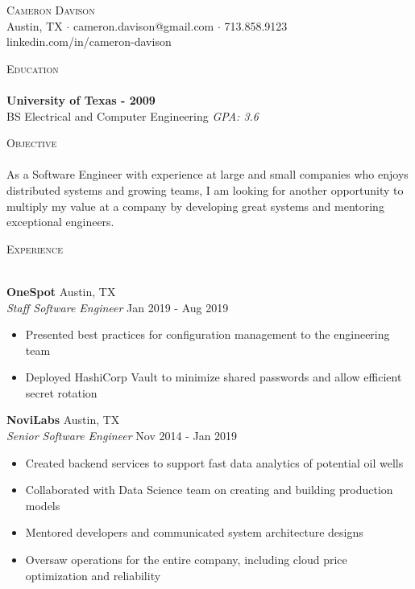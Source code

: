 \documentclass[a4paper]{article}
\newcommand{\lineunder} {
    \vspace*{-8pt} \\
    \hspace*{-18pt} \hrulefill \\
}
\newcommand{\header} [1] {
    {\hspace*{-18pt}\vspace*{6pt} \textsc{#1}}
    \vspace*{-6pt} \lineunder
}
\begin{document}
\vspace*{-40pt}

\vspace*{-10pt}
\begin{center}
    {\Huge \scshape {Cameron Davison}}\\
    Austin, TX $\cdot$ cameron.davison@gmail.com $\cdot$ 713.858.9123\\
    linkedin.com/in/cameron-davison\\
\end{center}

\header{Education}
\textbf{University of Texas - 2009}\\
BS Electrical and Computer Engineering \textit{GPA: 3.6}\\
\vspace{2mm}

\header{Objective}
As a Software Engineer with experience at large and small companies who enjoys distributed systems and growing teams, I
am looking for another opportunity to multiply my value at a company by developing great systems and mentoring
exceptional engineers.
\vspace{2mm}

\header{Experience}
\vspace{1mm}

\textbf{OneSpot} \hfill Austin, TX\\
\textit{Staff Software Engineer} \hfill Jan 2019 - Aug 2019\\
\vspace{-1mm}
\begin{itemize} \itemsep 1pt
\item Presented best practices for configuration management to the engineering team
\item Deployed HashiCorp Vault to minimize shared passwords and allow efficient secret rotation
\end{itemize}

\textbf{NoviLabs} \hfill Austin, TX\\
\textit{Senior Software Engineer} \hfill Nov 2014 - Jan 2019\\
\vspace{-1mm}
\begin{itemize} \itemsep 1pt
\item Created backend services to support fast data analytics of potential oil wells
\item Collaborated with Data Science team on creating and building production models
\item Mentored developers and communicated system architecture designs
\item Oversaw operations for the entire company, including cloud price optimization and reliability
\end{itemize}
\end{document}
